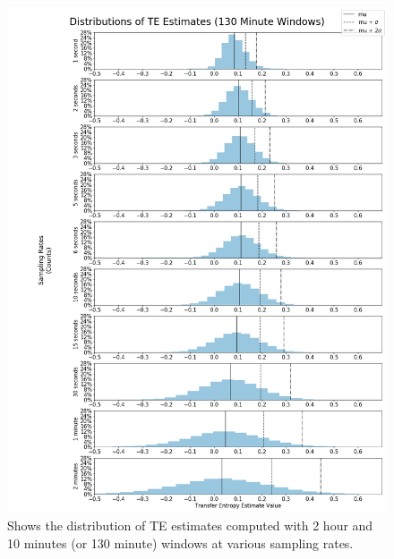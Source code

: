 \begin{figure}[!htb]
  \centerline{\includegraphics[scale=0.42]{figures/PredIF/130MinDist.png}}
  \caption{Shows the distribution of TE estimates computed with 2 hour and 10 minutes (or 130 minute) windows at various sampling rates.}
  \label{fig:130MinDist}
\end{figure}

